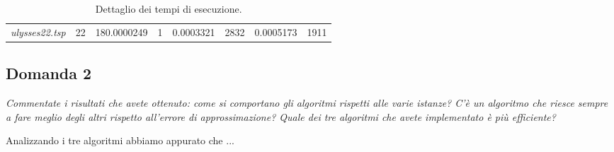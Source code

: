 \begin{table}[H]
\begin{tabular}{llrrrrrr}
  \textit{ulysses22.tsp} & 22         & 180.0000249                                                                                 & 1                                                                             & 0.0003321                                                                               & 2832                                                                          & 0.0005173                                                                                 & 1911                                                                           
  \end{tabular}
  \caption{Dettaglio dei tempi di esecuzione.}
  \label{tab:my-table}
  \end{table}

\subsection{Domanda 2}
\textit{Commentate i risultati che avete ottenuto: come si comportano gli algoritmi rispetti alle varie istanze?
C'è un algoritmo che riesce sempre a fare meglio degli altri rispetto all'errore di approssimazione? Quale dei tre
algoritmi che avete implementato è più efficiente?}


Analizzando i tre algoritmi abbiamo appurato che ...